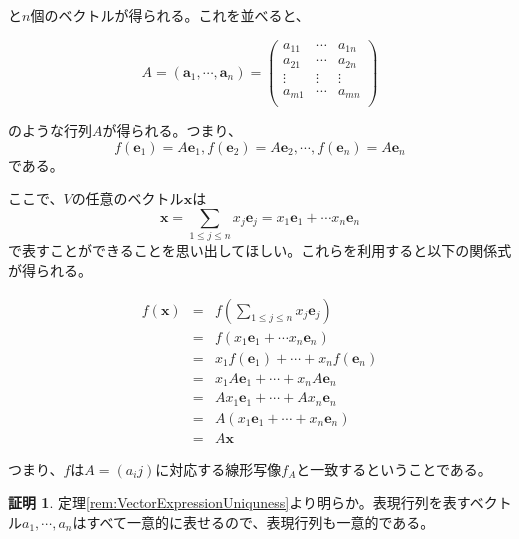 \documentclass[dvipdfmx,autodetect-engine]{jsarticle}
\theoremstyle{definition}
\newtheorem*{Proof*}{証明}
\begin{document}
と$n$個のベクトルが得られる。これを並べると、

$$
A = (\bm{a}_1, \cdots, \bm{a}_n) = 
\begin{pmatrix}
a_{11} & \cdots & a_{1n} \\
a_{21} & \cdots & a_{2n} \\
\vdots & \vdots & \vdots \\
a_{m1} & \cdots & a_{mn} \\
\end{pmatrix}
$$

のような行列$A$が得られる。つまり、
$$
f(\bm{e}_1) = A\bm{e}_1, f(\bm{e}_2) = A\bm{e}_2, \cdots, f(\bm{e}_n) = A\bm{e}_n
$$
である。

ここで、$V$の任意のベクトル$\bm{x}$は
$$
\bm{x} = \sum_{1 \leq j \leq n} x_{j}\bm{e}_j = x_1\bm{e}_1 + \cdots x_n\bm{e}_n
$$で表すことができることを思い出してほしい。これらを利用すると以下の関係式が得られる。

\begin{eqnarray*}
f(\bm{x}) &= &f(\sum_{1 \leq j \leq n} x_{j}\bm{e}_j)  \\
&= &f(x_1\bm{e}_1 + \cdots x_n\bm{e}_n) \\
&= &x_1f(\bm{e}_1) + \cdots + x_nf(\bm{e}_n) \\
&= &x_1A\bm{e}_1 + \cdots + x_nA\bm{e}_n \\
&= &Ax_1\bm{e}_1 + \cdots + Ax_n\bm{e}_n \\
&= &A(x_1\bm{e}_1 + \cdots + x_n\bm{e}_n) \\
&= &A\bm{x}
\end{eqnarray*}

つまり、$f$は$A = (a_ij)$に対応する線形写像$f_A$と一致するということである。



\begin{Proof*}
定理\ref{rem:VectorExpressionUniquness}より明らか。表現行列を表すベクトル$a_1, \cdots, a_n$はすべて一意的に表せるので、表現行列も一意的である。
\end{Proof*}
\end{document}

